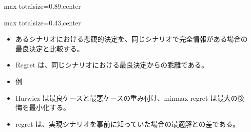 \begin{minipage}[t]{0.58\textwidth}
\begin{adjustbox}{max totalsize={\textwidth}{0.89\textheight},center}
\begin{minipage}{\textwidth}
\end{minipage}
\end{adjustbox}
\end{minipage}


\clearpage
{}
\begin{minipage}[t]{0.405\textwidth}
\begin{adjustbox}{max totalsize={\textwidth}{0.43\textheight},center}
\begin{minipage}{\textwidth}\scriptsize
{}\begin{itemize}
\item あるシナリオにおける悲観的決定を、同じシナリオで完全情報がある場合の最良決定と比較する。
\item Regret は、同じシナリオにおける最良決定からの乖離である。
\item 例
\end{itemize}\begin{itemize}
\item Hurwicz は最良ケースと最悪ケースの重み付け、minmax regret は最大の後悔を最小化する。
\item regret は、実現シナリオを事前に知っていた場合の最適解との差である。
\end{itemize}
\end{minipage}
\end{adjustbox}
\end{minipage}\hfill
